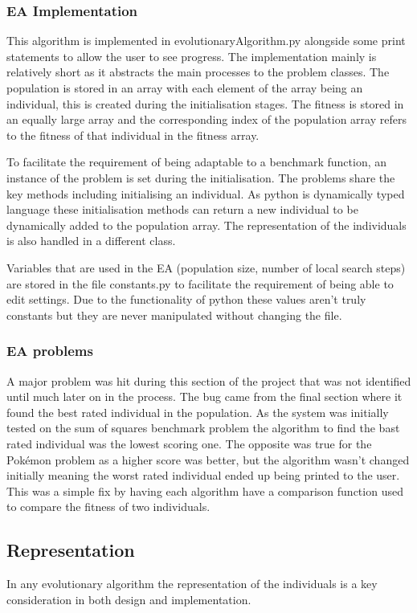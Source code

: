 \documentclass[a4paper]{article}
\newcommand{\Pokemon}{Pok\'{e}mon}
\begin{document}
\subsubsection{EA Implementation}
\par
This algorithm is implemented in evolutionaryAlgorithm.py alongside some print statements to allow the user to see progress.
The implementation mainly is relatively short as it abstracts the main processes to the problem classes.
The population is stored in an array with each element of the array being an individual, this is created during the initialisation stages.
The fitness is stored in an equally large array and the corresponding index of the population array refers to the fitness of that individual in the fitness array.
\par
To facilitate the requirement of being adaptable to a benchmark function, an instance of the problem is set during the initialisation.
The problems share the key methods including initialising an individual.
As python is dynamically typed language these initialisation methods can return a new individual to be dynamically added to the population array.
The representation of the individuals is also handled in a different class.
\par
Variables that are used in the EA (population size, number of local search steps) are stored in the file constants.py to facilitate the requirement of being able to edit settings.
Due to the functionality of python these values aren't truly constants but they are never manipulated without changing the file.
\subsubsection{EA problems}
\par
A major problem was hit during this section of the project that was not identified until much later on in the process.
The bug came from the final section where it found the best rated individual in the population.
As the system was initially tested on the sum of squares benchmark problem the algorithm to find the bast rated individual was the lowest scoring one.
The opposite was true for the \Pokemon{} problem as a higher score was better, but the algorithm wasn't changed initially meaning the worst rated individual ended up being printed to the user.
This was a simple fix by having each algorithm have a comparison function used to compare the fitness of two individuals.

\subsection{Representation}
In any evolutionary algorithm the representation of the individuals is a key consideration in both design and implementation.
\end{document}

